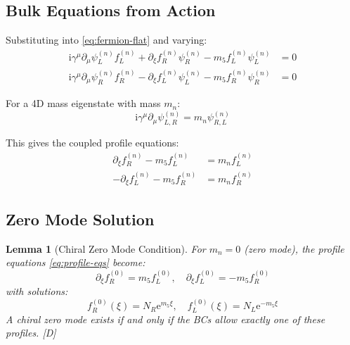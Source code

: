 \documentclass[11pt,a4paper]{article}
\newtheorem{lemma}[theorem]{Lemma}
\newcommand{\ii}{\mathrm{i}}
\newcommand{\ee}{\mathrm{e}}
\begin{document}
\subsection{Bulk Equations from Action}

Substituting into \eqref{eq:fermion-flat} and varying:
\begin{equation}
\begin{aligned}
\ii \gamma^\mu \partial_\mu \psi_L^{(n)} f_L^{(n)} + \partial_\xi f_R^{(n)} \psi_R^{(n)} - m_5 f_L^{(n)} \psi_L^{(n)} &= 0 \\
\ii \gamma^\mu \partial_\mu \psi_R^{(n)} f_R^{(n)} - \partial_\xi f_L^{(n)} \psi_L^{(n)} - m_5 f_R^{(n)} \psi_R^{(n)} &= 0
\end{aligned}
\label{eq:bulk-eom}
\end{equation}

For a 4D mass eigenstate with mass $m_n$:
\begin{equation}
\ii \gamma^\mu \partial_\mu \psi_{L,R}^{(n)} = m_n \psi_{R,L}^{(n)}
\label{eq:4d-dirac}
\end{equation}

This gives the coupled profile equations:
\begin{equation}
\boxed{
\begin{aligned}
\partial_\xi f_R^{(n)} - m_5 f_L^{(n)} &= m_n f_L^{(n)} \\
-\partial_\xi f_L^{(n)} - m_5 f_R^{(n)} &= m_n f_R^{(n)}
\end{aligned}
}
\label{eq:profile-eqs}
\end{equation}

\subsection{Zero Mode Solution}

\begin{lemma}[Chiral Zero Mode Condition]
\label{lem:zero-mode}
For $m_n = 0$ (zero mode), the profile equations \eqref{eq:profile-eqs} become:
\begin{equation}
\partial_\xi f_R^{(0)} = m_5 f_L^{(0)}, \quad \partial_\xi f_L^{(0)} = -m_5 f_R^{(0)}
\label{eq:zero-mode-eq}
\end{equation}
with solutions:
\begin{equation}
\boxed{
f_R^{(0)}(\xi) = N_R \ee^{m_5 \xi}, \quad f_L^{(0)}(\xi) = N_L \ee^{-m_5 \xi}
}
\label{eq:zero-mode-sol}
\end{equation}
A chiral zero mode exists if and only if the BCs allow exactly one of these profiles. [D]
\end{lemma}
\end{document}
